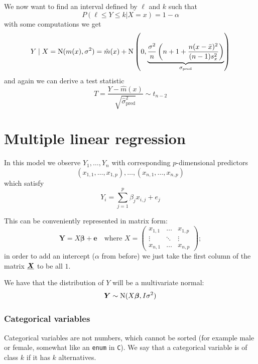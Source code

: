 \documentclass[12pt]{extarticle}
\newcommand{\Normal}{{\operatorfont N}}
\renewcommand{\vec}[1]{\bm{#1}}
\begin{document}
We now want to find an interval defined by $\ell$ and $k$ such that
\begin{equation}
	P(\ell \leq Y \leq k | X = x) = 1-\alpha
\end{equation}
with some computations we get
\begin{equation}
	Y \mid X = \Normal(m(x), \sigma^2) = \hat m(x) + \Normal\left(0, \underbrace{\frac{\sigma^2}{n}\left(n+1+ \frac{n(x-\bar x)^2}{(n-1)s^2_x}\right)}_{\sigma_\text{pred}} \right)
\end{equation}
and again we can derive a test statistic
\begin{equation}
	T = \frac{Y - \hat m(x)}{\sqrt{\hat \sigma^2_\text{pred}}} \sim t_{n-2}
\end{equation}

\section{Multiple linear regression}
In this model we observe $Y_1, \dots, Y_n$ with corresponding $p$-dimensional predictors
\begin{equation}
	(x_{1,1}, \dots, x_{1,p}), \dots, (x_{n, 1}, \dots, x_{n,p})
\end{equation}
which satisfy
\begin{equation}
	Y_i = \sum_{j = 1}^p \beta_j x_{i, j}+ e_j
\end{equation}

This can be conveniently represented in matrix form:
\begin{equation}
	\vec Y = X \vec \beta + \vec e \quad \text{where } X = \begin{pmatrix}
		x_{1, 1} & \dots  & x_{1, p} \\
		\vdots   & \ddots & \vdots   \\
		x_{n, 1} & \dots  & x_{n, p}
	\end{pmatrix};
\end{equation}
in order to add an intercept ($\alpha$ from before) we just take the first column of the matrix $\uvec X$ to be all $1$.

We have that the distribution of $Y$ will be a multivariate normal:
\begin{equation}
	\vec Y \sim \Normal(X \vec \beta, I \sigma ^2)
\end{equation}


\subsubsection{Categorical variables}
Categorical variables are not numbers, which cannot be sorted
(for example male or female, somewhat like an \texttt{enum} in \texttt{C}).
We say that a categorical variable is of class $k$ if it has $k$ alternatives.
\end{document}
